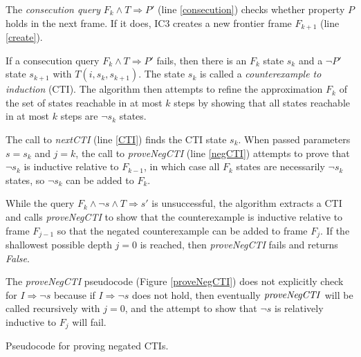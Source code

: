 \documentclass[12pt,a4paper,twoside,openright]{report}
\begin{document}
{{%
The \emph{consecution query} $F_k \wedge T \Rightarrow P'$ (line \ref{consecution})
checks whether property $P$ holds in the next
frame. If it does, IC3 creates a new
frontier frame $F_{k + 1}$ (line \ref{create}).

If a consecution query $F_k \wedge T \Rightarrow P'$ fails, then
there is an $F_k$ state $s_k$ and a $\neg P'$ state $s_{k + 1}$ with $T(i,s_k,s_{k + 1})$.
The state $s_k$ is called a \emph{counterexample to induction} (CTI).
The algorithm then attempts to refine the approximation $F_k$ of the set of states
reachable in at most $k$ steps by showing that all states
reachable in at most $k$ steps are $\neg s_k$ states.

The call to {\it nextCTI} (line \ref{CTI}) finds the CTI
state $s_k$. When passed parameters $s = s_k$ and $j = k$,
the call to {\it proveNegCTI} (line \ref{negCTI})
attempts to prove that $\neg s_k$ is inductive relative to $F_{k - 1}$,
in which case all $F_k$ states are necessarily $\neg s_k$ states, so $\neg s_k$ can
be added to $F_k$.

While the query
$F_k \wedge \neg s \wedge T \Rightarrow s'$ is unsuccessful,
the algorithm extracts a CTI and
calls {\it proveNegCTI} to show that the counterexample is
inductive relative to frame $F_{j - 1}$ so that the negated
counterexample can be added to frame $F_j$.
If the shallowest possible depth $j = 0$ is reached, then
{\it proveNegCTI} fails and returns {\it False}.

The {\it proveNegCTI} pseudocode (Figure \ref{proveNegCTI})
does not explicitly check for $I \Rightarrow
\neg s$ because if
$I \Rightarrow \neg s$ does not hold, then eventually ${\it proveNegCTI}$
will be called recursively with $j = 0$, and the attempt to show that
$\neg s$ is relatively inductive to $F_j$ will fail.

\begin{algorithm}[t]
\DontPrintSemicolon
{}
\caption{Pseudocode for proving negated CTIs.}
\label{proveNegCTI}
\end{algorithm}

}}
\end{document}
